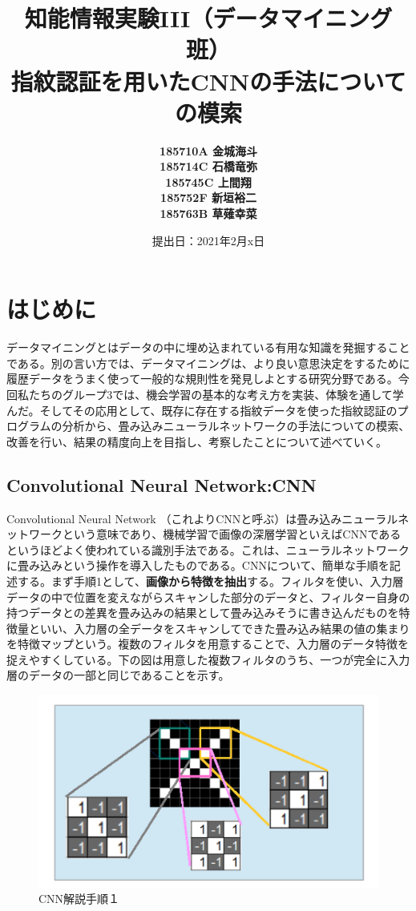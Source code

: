 \documentclass[a4paper, 11pt, titlepage]{jsarticle}
\title{知能情報実験III（データマイニング班）\\指紋認証を用いたCNNの手法についての模索}
\author{\textbf{185710A 金城海斗}\\
\textbf{185714C 石橋竜弥}\\
 \textbf{185745C 上間翔}\\
 \textbf{185752F 新垣裕二}\\
 \textbf{185763B 草薙幸菜}}
\date{提出日：2021年2月x日}
\begin{document}
\maketitle
\tableofcontents
\clearpage


\section{はじめに}
データマイニングとはデータの中に埋め込まれている有用な知識を発掘することである。別の言い方では、データマイニングは、より良い意思決定をするために履歴データをうまく使って一般的な規則性を発見しよとする研究分野である。今回私たちのグループ3では、機会学習の基本的な考え方を実装、体験を通して学んだ。そしてその応用として、既存に存在する指紋データを使った指紋認証のプログラムの分析から、畳み込みニューラルネットワークの手法についての模索、改善を行い、結果の精度向上を目指し、考察したことについて述べていく。

\subsection{Convolutional Neural Network:CNN}
Convolutional Neural Network （これよりCNNと呼ぶ）は畳み込みニューラルネットワークという意味であり、機械学習で画像の深層学習といえばCNNであるというほどよく使われている識別手法である。これは、ニューラルネットワークに畳み込みという操作を導入したものである。CNNについて、簡単な手順を記述する。まず手順1として、\textbf{画像から特徴を抽出}する。フィルタを使い、入力層データの中で位置を変えながらスキャンした部分のデータと、フィルター自身の持つデータとの差異を畳み込みの結果として畳み込みそうに書き込んだものを特徴量といい、入力層の全データをスキャンしてできた畳み込み結果の値の集まりを特徴マップという。複数のフィルタを用意することで、入力層のデータ特徴を捉えやすくしている。下の図は用意した複数フィルタのうち、一つが完全に入力層のデータの一部と同じであることを示す。

\begin{figure}[h]
  \centering
  \includegraphics[scale=0.4]{cnn1.png}
  \caption{CNN解説手順１}
  \label{cnn}
\end{figure}
\end{document}
